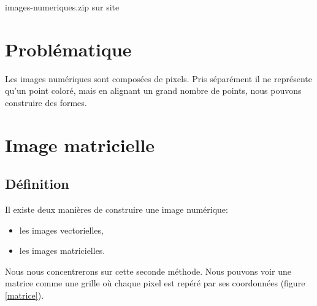 \documentclass[a4paper,11pt]{article}
\begin{document}
\begin{Form}
\begin{commentprof}
images-numeriques.zip sur site
\end{commentprof}
\section{Problématique}
Les images numériques sont composées de pixels. Pris séparément il ne représente qu'un point coloré, mais en alignant un grand nombre de points, nous pouvons construire des formes. 
\begin{center}
\end{center}
\section{Image matricielle}
\subsection{Définition}
Il existe deux manières de construire une image numérique:
\begin{itemize}
\item les images vectorielles,
\item les images matricielles.
\end{itemize}
Nous nous concentrerons sur cette seconde méthode. Nous pouvons voir une matrice comme une grille où chaque pixel est repéré par ses coordonnées (figure \ref{matrice}).
\begin{center}
\end{center}
\end{Form}
\end{document}
